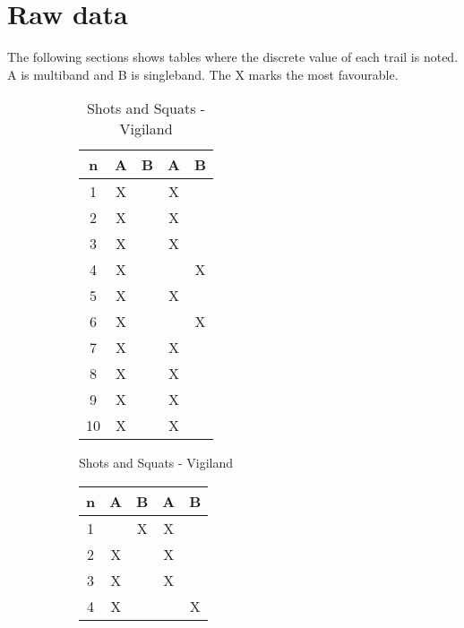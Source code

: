 \section{Raw data}\label{sec:rawdata_listning}
The following sections shows tables where the discrete value of each trail is noted. A is multiband and B is singleband. The X marks the most favourable. 
\begin{figure}[H]
\centering
\begin{subfigure}[t]{0.20\textwidth}
\begin{table}[H]
\centering
\begin{tabular}{ccccc}
n        & A       & B       & A       & B      \\ \bottomrule 
1        & X       &         & X       &        \\
2        & X       &         & X       &        \\
3        & X       &         & X       &        \\
4        & X       &         &         & X      \\
5        & X       &         & X       &        \\ \hline
6        & X       &         &         & X      \\
7        & X       &         & X       &        \\
8        & X       &         & X       &        \\
9        & X       &         & X       &        \\
10       & X       &         & X       &        \\ \bottomrule 
\end{tabular}
\caption{Shots and Squats - Vigiland}
\label{tab:shotsandsquats}
\end{table}
\end{subfigure}
\hfill
\begin{subfigure}[t]{0.20\textwidth}
\begin{table}[H]
\centering
\begin{tabular}{ccccc}
n         & A        & B        & A       & B       \\ \bottomrule 
1         &          & X        & X       &         \\
2         & X        &          & X       &         \\
3         & X        &          & X       &         \\
4         & X        &          &         & X       \\

\end{tabular}
\end{table}
\end{subfigure}
\end{figure}
